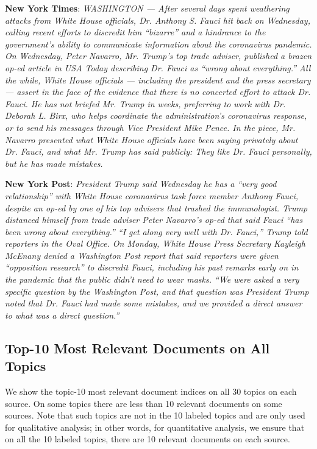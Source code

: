 \documentclass[11pt]{article}
\begin{document}
\textbf{New York Times}: \emph{WASHINGTON — After several days spent weathering attacks from White House officials, Dr. Anthony S. Fauci hit back on Wednesday, calling recent efforts to discredit him “bizarre” and a hindrance to the government’s ability to communicate information about the coronavirus pandemic. On Wednesday, Peter Navarro, Mr. Trump’s top trade adviser, published a brazen op-ed article in USA Today describing Dr. Fauci as “wrong about everything.” All the while, White House officials — including the president and the press secretary — assert in the face of the evidence that there is no concerted effort to attack Dr. Fauci. He has not briefed Mr. Trump in weeks, preferring to work with Dr. Deborah L. Birx, who helps coordinate the administration’s coronavirus response, or to send his messages through Vice President Mike Pence. In the piece, Mr. Navarro presented what White House officials have been saying privately about Dr. Fauci, and what Mr. Trump has said publicly: They like Dr. Fauci personally, but he has made mistakes.}


\textbf{New York Post}: \emph{President Trump said Wednesday he has a “very good relationship” with White House coronavirus task force member Anthony Fauci, despite an op-ed by one of his top advisers that trashed the immunologist. Trump distanced himself from trade adviser Peter Navarro’s op-ed that said Fauci “has been wrong about everything.” “I get along very well with Dr. Fauci,” Trump told reporters in the Oval Office. On Monday, White House Press Secretary Kayleigh McEnany denied a Washington Post report that said reporters were given “opposition research” to discredit Fauci, including his past remarks early on in the pandemic that the public didn’t need to wear masks. “We were asked a very specific question by the Washington Post, and that question was President Trump noted that Dr. Fauci had made some mistakes, and we provided a direct answer to what was a direct question.”}


\subsection{Top-10 Most Relevant Documents on All Topics}
We show the topic-10 most relevant document indices on all 30 topics on each source. On some topics there are less than 10 relevant documents on some sources. Note that such topics are not in the 10 labeled topics and are only used for qualitative analysis; in other words, for quantitative analysis, we ensure that on all the 10 labeled topics, there are 10 relevant documents on each source.
\end{document}
